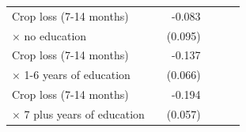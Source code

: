 \documentclass[letterpaper,12pt]{article}
\newcommand{\mco}[1]{\multicolumn{1}{c}{#1}}
\newcommand{\X}{$\times$ }
\newcommand{\hs}{\hspace{15pt}}
\begin{document}
\begin{table}[htbp]
\begin{center}
\begin{small}
\begin{threeparttable}
\begin{tabular}{@{} l D{.}{.}{1.5} D{.}{.}{1.5}  D{.}{.}{1.5} D{.}{.}{1.5} D{.}{.}{1.5}  @{}}
Crop loss (7-14 months)                                &                     &      -0.083         &                     &                     &                     \\
\hs \X no education                                    &                     &     (0.095)         &                     &                     &                     \\
Crop loss (7-14 months)                                &                     &      -0.137\sym{**} &                     &                     &                     \\
\hs \X 1-6 years of education                          &                     &     (0.066)         &                     &                     &                     \\
Crop loss (7-14 months)                                &                     &      -0.194\sym{***}&                     &                     &                     \\
\hs \X 7 plus years of education                       &                     &     (0.057)         &                     &                     &                     \\

\end{tabular}
\end{threeparttable}
\end{small}
\end{center}
\end{table}
\end{document}
